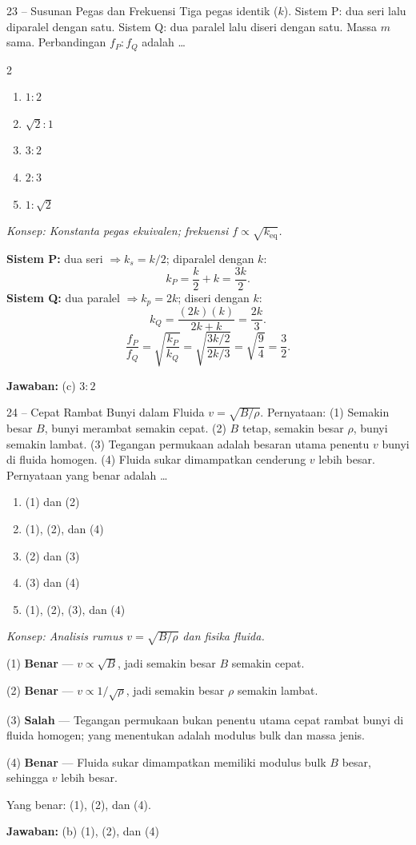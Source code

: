 \documentclass[11pt]{article}
\newcommand{\jawaban}[1]{%
  \noindent\colorbox{gold!30}{\parbox{\dimexpr\linewidth-2\fboxsep\relax}{%
    \textbf{Jawaban:} #1}}\par\smallskip}
\newcommand{\konsep}[1]{\textit{Konsep: #1.}\par\smallskip}
\newenvironment{pil}{%
  \begin{enumerate}[label=(\alph*),leftmargin=*,itemsep=1pt,topsep=3pt]}%
  {\end{enumerate}}
\newenvironment{pilB}{%
  \par\smallskip\begin{multicols}{2}
  \begin{enumerate}[label=(\alph*),leftmargin=*,itemsep=1pt,topsep=3pt]}%
  {\end{enumerate}\end{multicols}}
\begin{document}
\begin{soal}{23 -- Susunan Pegas dan Frekuensi}
Tiga pegas identik ($k$). Sistem P: dua seri lalu diparalel dengan satu. Sistem Q: dua
paralel lalu diseri dengan satu. Massa $m$ sama. Perbandingan $f_P:f_Q$ adalah \ldots
\begin{pilB}
  \item $1:2$ \item $\sqrt{2}:1$ \item $3:2$ \item $2:3$ \item $1:\sqrt{2}$
\end{pilB}
\end{soal}
\begin{pembox}
\konsep{Konstanta pegas ekuivalen; frekuensi $f\propto\sqrt{k_{\text{eq}}}$}
\textbf{Sistem P:} dua seri $\Rightarrow k_s=k/2$; diparalel dengan $k$:
\[
k_P = \frac{k}{2} + k = \frac{3k}{2}.
\]
\textbf{Sistem Q:} dua paralel $\Rightarrow k_p=2k$; diseri dengan $k$:
\[
k_Q = \frac{(2k)(k)}{2k+k} = \frac{2k}{3}.
\]
\[
\frac{f_P}{f_Q} = \sqrt{\frac{k_P}{k_Q}} = \sqrt{\frac{3k/2}{2k/3}} = \sqrt{\frac{9}{4}} = \frac{3}{2}.
\]
\jawaban{(c) $3:2$}
\end{pembox}

\begin{soal}{24 -- Cepat Rambat Bunyi dalam Fluida}
$v=\sqrt{B/\rho}$. Pernyataan:
(1) Semakin besar $B$, bunyi merambat semakin cepat.
(2) $B$ tetap, semakin besar $\rho$, bunyi semakin lambat.
(3) Tegangan permukaan adalah besaran utama penentu $v$ bunyi di fluida homogen.
(4) Fluida sukar dimampatkan cenderung $v$ lebih besar.
Pernyataan yang benar adalah \ldots
\begin{pil}
  \item (1) dan (2) \item (1), (2), dan (4)
  \item (2) dan (3) \item (3) dan (4) \item (1), (2), (3), dan (4)
\end{pil}
\end{soal}
\begin{pembox}
\konsep{Analisis rumus $v=\sqrt{B/\rho}$ dan fisika fluida}

(1) \textbf{Benar} --- $v\propto\sqrt{B}$, jadi semakin besar $B$ semakin cepat.

(2) \textbf{Benar} --- $v\propto 1/\sqrt{\rho}$, jadi semakin besar $\rho$ semakin lambat.

(3) \textbf{Salah} --- Tegangan permukaan bukan penentu utama cepat rambat bunyi di fluida homogen; yang menentukan adalah modulus bulk dan massa jenis.

(4) \textbf{Benar} --- Fluida sukar dimampatkan memiliki modulus bulk $B$ besar, sehingga $v$ lebih besar.

Yang benar: (1), (2), dan (4).
\jawaban{(b) (1), (2), dan (4)}
\end{pembox}
\end{document}
